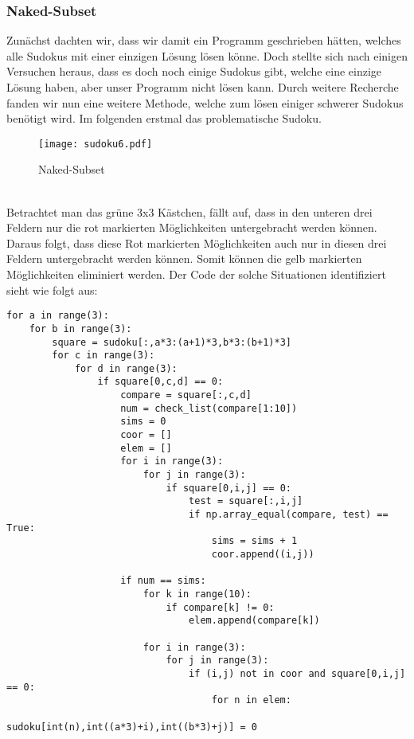\documentclass[11pt,a4paper]{article}
\begin{document}
\subsubsection{Naked-Subset}
Zunächst dachten wir, dass wir damit ein Programm geschrieben hätten, welches alle Sudokus mit einer einzigen Lösung lösen könne. Doch stellte sich nach einigen Versuchen heraus, dass es doch noch einige Sudokus gibt, welche eine einzige Lösung haben, aber unser Programm nicht lösen kann. Durch weitere Recherche fanden wir nun eine weitere Methode, welche zum lösen einiger schwerer Sudokus benötigt wird. Im folgenden erstmal das problematische Sudoku.
\newpage
\ \\
\begin{figure}[htbp!]
\begin{center}
\texttt{[image: sudoku6.pdf]}
\end{center}
\caption{Naked-Subset}
\end{figure}
\ \\ 
Betrachtet man das grüne 3x3 Kästchen, fällt auf, dass in den unteren drei Feldern nur die rot markierten Möglichkeiten untergebracht werden können. Daraus folgt, dass diese Rot markierten Möglichkeiten auch nur in diesen drei Feldern untergebracht werden können. Somit können die gelb markierten Möglichkeiten eliminiert werden. Der Code der solche Situationen identifiziert sieht wie folgt aus:
\begin{verbatim}
for a in range(3):   
    for b in range(3): 
        square = sudoku[:,a*3:(a+1)*3,b*3:(b+1)*3]  
        for c in range(3):      
            for d in range(3):  
                if square[0,c,d] == 0:              
                    compare = square[:,c,d]         
                    num = check_list(compare[1:10]) 
                    sims = 0                        
                    coor = []                      
                    elem = []                       
                    for i in range(3):              
                        for j in range(3):          
                            if square[0,i,j] == 0:  
                                test = square[:,i,j]
                                if np.array_equal(compare, test) == True: 
                                    sims = sims + 1                       
                                    coor.append((i,j))                    
                                             
                    if num == sims:                    
                        for k in range(10):             
                            if compare[k] != 0:
                                elem.append(compare[k])
                                    
                        for i in range(3):     
                            for j in range(3):
                                if (i,j) not in coor and square[0,i,j] == 0:
                                    for n in elem:                           
                                        sudoku[int(n),int((a*3)+i),int((b*3)+j)] = 0   
\end{verbatim}
\end{document}
